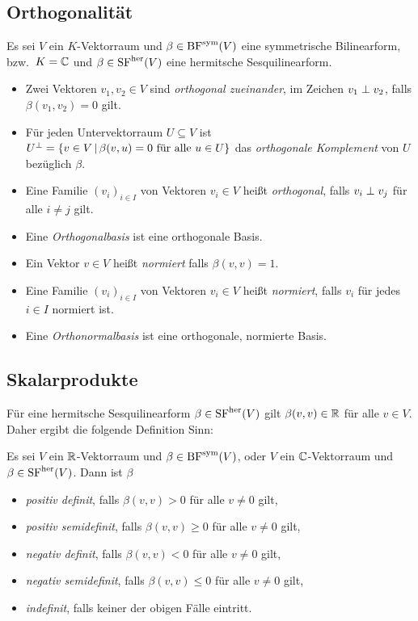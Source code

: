 \subsection{Orthogonalität}

Es sei $V$ ein $K$-Vektorraum und $\beta \in \operatorname{BF}^{\operatorname{sym}}(V)$ eine symmetrische Bilinearform, bzw.\ $K = \mathbb{C}$ und $\beta \in \operatorname{SF}^{\operatorname{her}}(V)$ eine hermitsche Sesquilinearform.

\begin{definition}
  \begin{itemize}
    \item
      Zwei Vektoren $v_1, v_2 \in V$ sind \emph{orthogonal zueinander}, im Zeichen $v_1 \mathrel{\perp} v_2$, falls $\beta(v_1, v_2) = 0$ gilt.
    \item
      Für jeden Untervektorraum $U \subseteq V$ ist $U^\perp = \{v \in V \,|\, \text{$\beta(v,u) = 0$ für alle $u \in U$}\}$ das \emph{orthogonale Komplement} von $U$ bezüglich $\beta$.
    \item
      Eine Familie $(v_i)_{i \in I}$ von Vektoren $v_i \in V$ heißt \emph{orthogonal}, falls $v_i \mathrel{\perp} v_j$ für alle $i \neq j$ gilt.
    \item
      Eine \emph{Orthogonalbasis} ist eine orthogonale Basis.
    \item
      Ein Vektor $v \in V$ heißt \emph{normiert} falls $\beta(v,v) = 1$.
    \item
      Eine Familie $(v_i)_{i \in I}$ von Vektoren $v_i \in V$ heißt \emph{normiert}, falls $v_i$ für jedes $i \in I$ normiert ist.
    \item
      Eine \emph{Orthonormalbasis} ist eine orthogonale, normierte Basis.
  \end{itemize}
\end{definition}




\subsection{Skalarprodukte}

Für eine hermitsche Sesquilinearform $\beta \in \operatorname{SF}^{\operatorname{her}}(V)$ gilt $\beta(v,v) \in \mathbb{R}$ für alle $v \in V$.
Daher ergibt die folgende Definition Sinn:

\begin{definition}
  Es sei $V$ ein $\mathbb{R}$-Vektorraum und $\beta \in \operatorname{BF}^{\operatorname{sym}}(V)$, oder $V$ ein $\mathbb{C}$-Vektorraum und $\beta \in \operatorname{SF}^{\operatorname{her}}(V)$.
  Dann ist $\beta$
  \begin{itemize}
    \item
      \emph{positiv definit}, falls $\beta(v,v) > 0$ für alle $v \neq 0$ gilt,
    \item
      \emph{positiv semidefinit}, falls $\beta(v,v) \geq 0$ für alle $v \neq 0$ gilt,
    \item
      \emph{negativ definit}, falls $\beta(v,v) < 0$ für alle $v \neq 0$ gilt,
    \item
      \emph{negativ semidefinit}, falls $\beta(v,v) \leq 0$ für alle $v \neq 0$ gilt,
    \item
      \emph{indefinit}, falls keiner der obigen Fälle eintritt.
  \end{itemize}
\end{definition}

